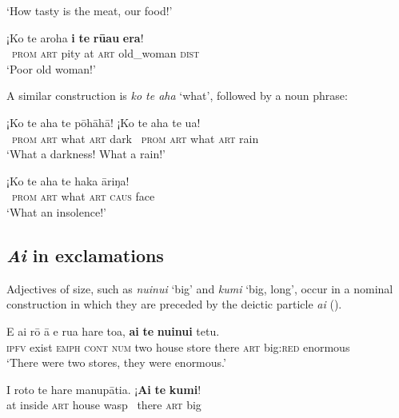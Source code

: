 \glt 
‘How tasty is the meat, our food!’ \textstyleExampleref{[R333.543]} 
\z

\ea\label{ex:10.83}
\gll ¡Ko te {\ꞌ}aroha \textbf{i} \textbf{te} \textbf{rū{\ꞌ}au} \textbf{era}! \\
~\textsc{prom} \textsc{art} pity at \textsc{art} old\_woman \textsc{dist} \\

\glt
‘Poor old woman!’ \textstyleExampleref{[R413.103]} 
\z

A similar construction is \textit{ko te aha} ‘what’, followed by a noun phrase:

\ea\label{ex:10.84}
\gll ¡Ko te aha te pōhāhā! ¡Ko te aha te {\ꞌ}ua! \\
~\textsc{prom} \textsc{art} what \textsc{art} dark \textsc{~prom} \textsc{art} what \textsc{art} rain \\

\glt 
‘What a darkness! What a rain!’ \textstyleExampleref{[R241.035–036]}
\z

\ea\label{ex:10.85}
\gll ¡Ko te aha te haka {\ꞌ}āriŋa! \\
~\textsc{prom} \textsc{art} what \textsc{art} \textsc{caus} face \\

\glt 
‘What an insolence!’ \textstyleExampleref{[R208.083]} 
\z

\subsection{\textit{{\ꞌ}Ai} in exclamations}\label{sec:10.4.3}

Adjectives of size, such as \textit{nuinui} ‘big’ and \textit{kumi} ‘big, long’, occur in a nominal construction in which they are preceded by the deictic particle \textit{{\ꞌ}ai} ().

\ea\label{ex:10.86}
\gll E ai rō {\ꞌ}ā e rua hare toa, \textbf{{\ꞌ}ai} \textbf{te} \textbf{nuinui} tetu. \\
\textsc{ipfv} exist \textsc{emph} \textsc{cont} \textsc{num} two house store there \textsc{art} big:\textsc{red} enormous \\

\glt 
‘There were two stores, they were enormous.’ \textstyleExampleref{[R239.072]} 
\z

\ea\label{ex:10.87}
\gll {\ꞌ}I roto te hare manupātia. ¡\textbf{{\ꞌ}Ai} \textbf{te} \textbf{kumi}! \\
at inside \textsc{art} house wasp ~there \textsc{art} big \\


